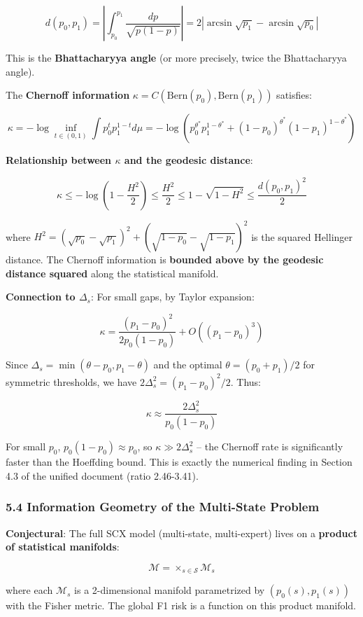 \documentclass[
  12pt,
]{ctexart}
\begin{document}
\[d(p_0, p_1) = \left|\int_{p_0}^{p_1} \frac{dp}{\sqrt{p(1-p)}}\right| = 2\left|\arcsin\sqrt{p_1} - \arcsin\sqrt{p_0}\right|\]

This is the \textbf{Bhattacharyya angle} (or more precisely, twice the
Bhattacharyya angle).

The \textbf{Chernoff information}
\(\kappa = C(\text{Bern}(p_0), \text{Bern}(p_1))\) satisfies:

\[\kappa = -\log \inf_{t \in (0,1)} \int p_0^t p_1^{1-t} d\mu = -\log\left(p_0^{\theta^*} p_1^{1-\theta^*} + (1-p_0)^{\theta^*} (1-p_1)^{1-\theta^*}\right)\]

\textbf{Relationship between \(\kappa\) and the geodesic distance}:

\[\kappa \leq -\log\left(1 - \frac{H^2}{2}\right) \leq \frac{H^2}{2} \leq 1 - \sqrt{1 - H^2} \leq \frac{d(p_0, p_1)^2}{2}\]

where
\(H^2 = (\sqrt{p_0} - \sqrt{p_1})^2 + (\sqrt{1-p_0} - \sqrt{1-p_1})^2\)
is the squared Hellinger distance. The Chernoff information is
\textbf{bounded above by the geodesic distance squared} along the
statistical manifold.

\textbf{Connection to \(\Delta_s\)}: For small gaps, by Taylor
expansion:

\[\kappa = \frac{(p_1 - p_0)^2}{2p_0(1-p_0)} + O((p_1-p_0)^3)\]

Since \(\Delta_s = \min(\theta - p_0, p_1 - \theta)\) and the optimal
\(\theta = (p_0 + p_1)/2\) for symmetric thresholds, we have
\(2\Delta_s^2 = (p_1 - p_0)^2/2\). Thus:

\[\kappa \approx \frac{2\Delta_s^2}{p_0(1-p_0)}\]

For small \(p_0\), \(p_0(1-p_0) \approx p_0\), so
\(\kappa \gg 2\Delta_s^2\) -- the Chernoff rate is significantly faster
than the Hoeffding bound. This is exactly the numerical finding in
Section 4.3 of the unified document (ratio 2.46-3.41).

\subsubsection{5.4 Information Geometry of the Multi-State
Problem}\label{information-geometry-of-the-multi-state-problem}

\textbf{Conjectural}: The full SCX model (multi-state, multi-expert)
lives on a \textbf{product of statistical manifolds}:

\[\mathcal{M} = \times_{s \in \mathcal{S}} \mathcal{M}_s\]

where each \(\mathcal{M}_s\) is a 2-dimensional manifold parametrized by
\((p_0(s), p_1(s))\) with the Fisher metric. The global F1 risk is a
function on this product manifold.
\end{document}
